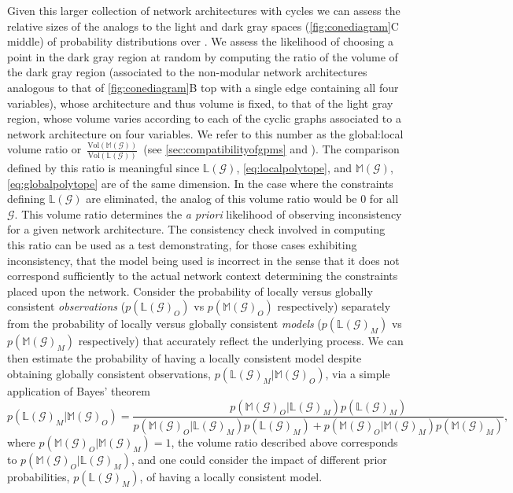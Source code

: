 Given this larger collection of network architectures with cycles we can assess the relative sizes of the analogs to the light and dark gray spaces (\ref{fig:conediagram}C middle) of probability distributions over \gnpm{}. We assess the likelihood of choosing a point in the dark gray region at random by computing the ratio of the volume of the dark gray region (associated to the non-modular network architectures analogous to that of \ref{fig:conediagram}B top with a single edge containing all four variables), whose architecture and thus volume is fixed, to that of the light gray region, whose volume varies according to each of the cyclic graphs associated to a network architecture on four variables. We refer to this number as the global:local volume ratio or~$\frac{\text{Vol}(\mathbb{M}(\mathcal{G}))}{\text{Vol}(\mathbb{L}(\mathcal{G}))}$~(see \ref{sec:compatibilityofgpms} and ). The comparison defined by this ratio is meaningful since $\mathbb{L}(\mathcal{G})$, \ref{eq:localpolytope}, and $\mathbb{M}(\mathcal{G})$, \ref{eq:globalpolytope} are of the same dimension. In the case where the constraints defining $\mathbb{L}(\mathcal{G})$ are eliminated, the analog of this volume ratio would be $0$ for all $\mathcal{G}$. This volume ratio determines the \emph{a priori} likelihood of observing inconsistency for a given network architecture. The consistency check involved in computing this ratio can be used as a test demonstrating, for those cases exhibiting inconsistency, that the model being used is incorrect in the sense that it does not correspond sufficiently to the actual network context determining the constraints placed upon the network. Consider the probability of locally versus globally consistent \emph{observations} ($p(\mathbb{L}(\mathcal{G})_O)$  vs $p(\mathbb{M}(\mathcal{G})_O)$ respectively) separately from the probability of locally versus globally consistent \emph{models} ($p(\mathbb{L}(\mathcal{G})_M)$  vs $p(\mathbb{M}(\mathcal{G})_M)$ respectively) that accurately reflect the underlying process. We can then estimate the probability of having a locally consistent model despite obtaining globally consistent observations, $p(\mathbb{L}(\mathcal{G})_M | \mathbb{M}(\mathcal{G})_O)$, via a simple application of Bayes' theorem
$$
p(\mathbb{L}(\mathcal{G})_M | \mathbb{M}(\mathcal{G})_O) = \frac{p(\mathbb{M}(\mathcal{G})_O | \mathbb{L}(\mathcal{G})_M)p(\mathbb{L}(\mathcal{G})_M)}{p(\mathbb{M}(\mathcal{G})_O | \mathbb{L}(\mathcal{G})_M)p(\mathbb{L}(\mathcal{G})_M) + p(\mathbb{M}(\mathcal{G})_O | \mathbb{M}(\mathcal{G})_M)p(\mathbb{M}(\mathcal{G})_M)},
$$
where $p(\mathbb{M}(\mathcal{G})_O | \mathbb{M}(\mathcal{G})_M)=1$, the volume ratio described above corresponds to $p(\mathbb{M}(\mathcal{G})_O | \mathbb{L}(\mathcal{G})_M)$, and one could consider the impact of different prior probabilities, $p(\mathbb{L}(\mathcal{G})_M)$, of having a locally consistent model.

